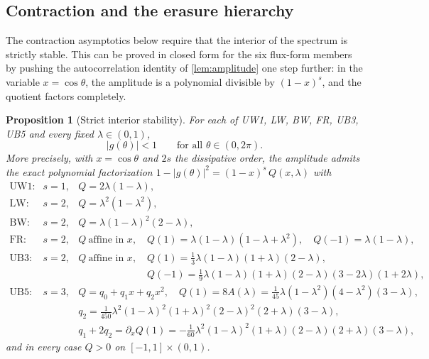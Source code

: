 \documentclass[pdflatex,sn-mathphys-num]{sn-jnl}%
\theoremstyle{thmstyleone}%
\newtheorem{proposition}{Proposition}%
\theoremstyle{thmstyletwo}%
\theoremstyle{thmstylethree}%
\begin{document}
\subsection{Contraction and the erasure hierarchy}\label{sec:contraction}

The contraction asymptotics below require that the interior of the spectrum is strictly stable.
This can be proved in closed form for the six flux-form members by pushing the autocorrelation identity of \cref{lem:amplitude} one step further: in the variable $x=\cos\theta$, the amplitude is a polynomial divisible by $(1-x)^s$, and the quotient factors completely.

\begin{proposition}[Strict interior stability]\label{prop:interior-stability}
For each of UW1, LW, BW, FR, UB3, UB5 and every fixed $\lambda\in(0,1)$, \[ |g(\theta)|<1 \qquad\text{for all }\theta\in(0,2\pi). \]
More precisely, with $x=\cos\theta$ and $2s$ the dissipative order, the amplitude admits the exact polynomial factorization $1-|g(\theta)|^2=(1-x)^s\,Q(x,\lambda)$ with \[
\begin{array}{lll}
\text{UW1:} & s=1, & Q=2\lambda(1-\lambda),\\[2pt]
\text{LW:}  & s=2, & Q=\lambda^2(1-\lambda^2),\\[2pt]
\text{BW:}  & s=2, & Q=\lambda(1-\lambda)^2(2-\lambda),\\[2pt]
\text{FR:}  & s=2, & Q\ \text{affine in } x,\quad
Q(1)=\lambda(1-\lambda)(1-\lambda+\lambda^2),\quad
Q(-1)=\lambda(1-\lambda),\\[2pt]
\text{UB3:} & s=2, & Q\ \text{affine in } x,\quad
Q(1)=\tfrac13\lambda(1-\lambda)(1+\lambda)(2-\lambda),\\[2pt]
            &      & \phantom{Q\ \text{affine in } x,\quad}
Q(-1)=\tfrac19\lambda(1-\lambda)(1+\lambda)(2-\lambda)(3-2\lambda)(1+2\lambda),\\[2pt]
\text{UB5:} & s=3, & Q=q_0+q_1x+q_2x^2,\quad
Q(1)=8A(\lambda)=\tfrac1{45}\lambda(1-\lambda^2)(4-\lambda^2)(3-\lambda),\\[2pt]
            &      & q_2=\tfrac1{450}\lambda^2(1-\lambda)^2(1+\lambda)^2(2-\lambda)^2(2+\lambda)(3-\lambda),\\[2pt]
            &      & q_1+2q_2=\partial_xQ(1)
=-\tfrac1{60}\lambda^2(1-\lambda)^2(1+\lambda)(2-\lambda)(2+\lambda)(3-\lambda),
\end{array}
\] and in every case $Q>0$ on $[-1,1]\times(0,1)$.
\end{proposition}
\end{document}
